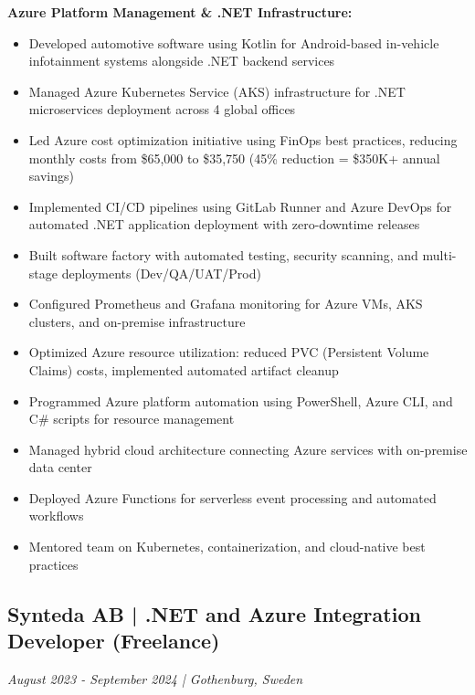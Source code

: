 \documentclass[11pt,a4paper]{article}
\begin{document}
\textbf{Azure Platform Management \& .NET Infrastructure:}
\begin{itemize}[leftmargin=*, itemsep=2pt]
\item Developed automotive software using Kotlin for Android-based in-vehicle infotainment systems alongside .NET backend services
\item Managed Azure Kubernetes Service (AKS) infrastructure for .NET microservices deployment across 4 global offices
\item Led Azure cost optimization initiative using FinOps best practices, reducing monthly costs from \$65,000 to \$35,750 (45\% reduction = \$350K+ annual savings)
\item Implemented CI/CD pipelines using GitLab Runner and Azure DevOps for automated .NET application deployment with zero-downtime releases
\item Built software factory with automated testing, security scanning, and multi-stage deployments (Dev/QA/UAT/Prod)
\item Configured Prometheus and Grafana monitoring for Azure VMs, AKS clusters, and on-premise infrastructure
\item Optimized Azure resource utilization: reduced PVC (Persistent Volume Claims) costs, implemented automated artifact cleanup
\item Programmed Azure platform automation using PowerShell, Azure CLI, and C\# scripts for resource management
\item Managed hybrid cloud architecture connecting Azure services with on-premise data center
\item Deployed Azure Functions for serverless event processing and automated workflows
\item Mentored team on Kubernetes, containerization, and cloud-native best practices
\end{itemize}

\subsection*{Synteda AB | .NET and Azure Integration Developer (Freelance)}
\textit{August 2023 - September 2024 | Gothenburg, Sweden}
\end{document}

